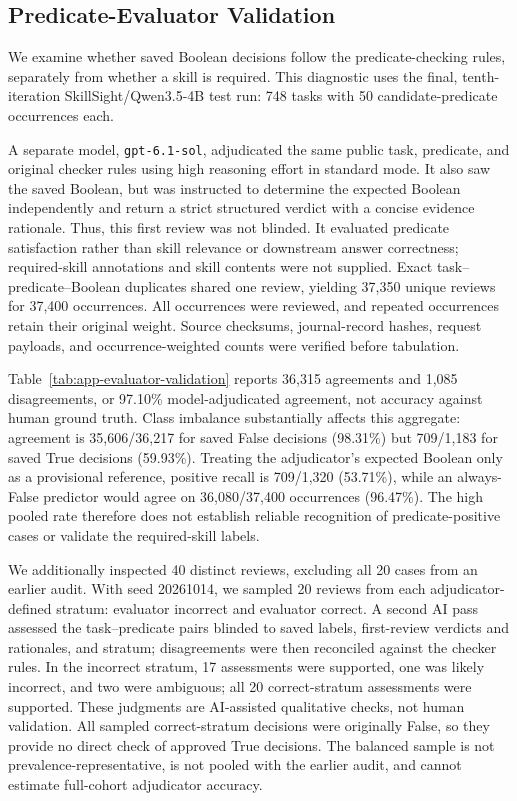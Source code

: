 \subsection{Predicate-Evaluator Validation}
\label{app:evaluator-validation}
We examine whether saved Boolean decisions follow the predicate-checking rules, separately from whether a skill is required. This diagnostic uses the final, tenth-iteration SkillSight/Qwen3.5-4B test run: 748 tasks with 50 candidate-predicate occurrences each.

A separate model, \texttt{gpt-6.1-sol}, adjudicated the same public task, predicate, and original checker rules using high reasoning effort in standard mode. It also saw the saved Boolean, but was instructed to determine the expected Boolean independently and return a strict structured verdict with a concise evidence rationale. Thus, this first review was not blinded. It evaluated predicate satisfaction rather than skill relevance or downstream answer correctness; required-skill annotations and skill contents were not supplied. Exact task--predicate--Boolean duplicates shared one review, yielding 37,350 unique reviews for 37,400 occurrences. All occurrences were reviewed, and repeated occurrences retain their original weight. Source checksums, journal-record hashes, request payloads, and occurrence-weighted counts were verified before tabulation.



Table~\ref{tab:app-evaluator-validation} reports 36,315 agreements and 1,085 disagreements, or 97.10\% model-adjudicated agreement, not accuracy against human ground truth. Class imbalance substantially affects this aggregate: agreement is 35,606/36,217 for saved False decisions (98.31\%) but 709/1,183 for saved True decisions (59.93\%). Treating the adjudicator's expected Boolean only as a provisional reference, positive recall is 709/1,320 (53.71\%), while an always-False predictor would agree on 36,080/37,400 occurrences (96.47\%). The high pooled rate therefore does not establish reliable recognition of predicate-positive cases or validate the required-skill labels.

We additionally inspected 40 distinct reviews, excluding all 20 cases from an earlier audit. With seed 20261014, we sampled 20 reviews from each adjudicator-defined stratum: evaluator incorrect and evaluator correct. A second AI pass assessed the task--predicate pairs blinded to saved labels, first-review verdicts and rationales, and stratum; disagreements were then reconciled against the checker rules. In the incorrect stratum, 17 assessments were supported, one was likely incorrect, and two were ambiguous; all 20 correct-stratum assessments were supported. These judgments are AI-assisted qualitative checks, not human validation. All sampled correct-stratum decisions were originally False, so they provide no direct check of approved True decisions. The balanced sample is not prevalence-representative, is not pooled with the earlier audit, and cannot estimate full-cohort adjudicator accuracy.
